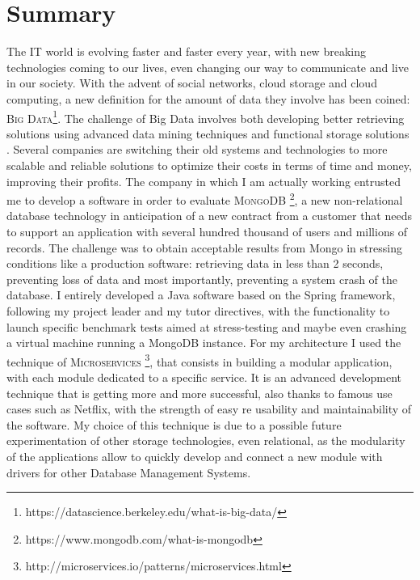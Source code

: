 \chapter*{Summary} %
\label{Summary}


The IT world is evolving faster and faster every year, with new breaking technologies coming to our lives, even changing our way to communicate and live in our society. With the advent of social networks, cloud storage and cloud computing, a new definition for the amount of data they involve has been coined: \textsc{Big Data}\footnote{https://datascience.berkeley.edu/what-is-big-data/}.
The challenge of Big Data involves both developing better retrieving solutions using advanced data mining techniques and functional storage solutions \cite{whitepaper}.
Several companies are switching their old systems and technologies to more scalable and reliable solutions to optimize their costs in terms of time and money, improving their profits.
The company in which I am actually working entrusted me to develop a software in order to evaluate \textsc{MongoDB} \footnote{https://www.mongodb.com/what-is-mongodb}, a new non-relational database technology in anticipation of a new  contract from a customer that needs to support an application with several hundred thousand of users and millions of records.
The challenge was to obtain acceptable results from Mongo in stressing conditions like a production software: retrieving data in less than 2 seconds, preventing loss of data and most importantly, preventing a system crash of the database.
I entirely developed a Java software based on the Spring framework, following my project leader and my tutor directives, with the functionality to launch specific benchmark tests aimed at stress-testing and maybe even crashing a virtual machine running a MongoDB instance.
For my architecture I used the technique of \textsc{Microservices} \footnote{http://microservices.io/patterns/microservices.html}, that consists in building a modular application, with each module dedicated to a specific service. It is an advanced development technique that is getting more and more successful, also thanks to famous use cases such as Netflix, with the strength of easy re usability and maintainability of the software.
My choice of this technique is due to a possible future experimentation of other storage technologies, even relational, as the modularity of the applications allow to quickly develop and connect a new module with drivers for other Database Management Systems.
